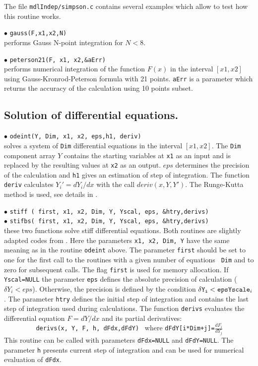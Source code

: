 \documentclass[12pt,a4paper]{article}
\begin{document}
The file \verb|mdlIndep/simpson.c|  contains several examples which allow to test how this routine works.


\noindent$\bullet$ \verb|gauss(F,x1,x2,N)|\\
performs Gauss N-point integration for $N<8$.  


\noindent$\bullet$ \verb|peterson21(F, x1, x2,&aErr)|\\
performs numerical integration of the function $F(x)$ in the interval $[x1,x2]$ using Gauss-Kronrod-Peterson formula with 21 points. {\tt aErr} is a  parameter which returns the accuracy of the calculation using 10 points subset.  

\subsection{ Solution of differential equations.} 
\noindent$\bullet$ \verb|odeint(Y, Dim, x1, x2, eps,h1, deriv)|\\
solves a  system of \verb|Dim| differential  equations in the interval 
$[x1,x2]$. The  \verb|Dim| component array $Y$ contains the starting variables at \verb|x1| as an input and is replaced by the
resulting values at \verb|x2| as an output. $eps$ determines the precision of the 
calculation and  \verb|h1| gives an estimation of step of integration.  
The function \verb|deriv| calculates 
$Y_i' = dY_i/dx$ with the call $deriv(x,Y,Y')$. The Runge-Kutta method is
used, see details in \cite{Numerical}. 


\noindent$\bullet$ \verb|stiff ( first, x1, x2, Dim, Y, Yscal, eps, &htry,derivs)|\\
\noindent$\bullet$ \verb|stifbs( first, x1, x2, Dim, Y, Yscal, eps, &htry,derivs)|\\
these two functions solve  stiff  differential
equations. Both routines  are slightly adapted codes from
\cite{Numerical}. Here the parameters  {\tt x1, x2, Dim, Y} have the same
meaning as in the routine  {\tt odeint}  above. The parameter {\tt first}
should be set to one for the first call to the routines with a given number of equations {\tt
Dim} and to zero for subsequent calls.  The flag {\tt first} is used for memory allocation.  If {\tt Yscal=NULL}  the parameter
{\tt eps} defines the absolute precision of calculation ($\delta Y_i < eps$).  Otherwise, the
precision is defined by the  condition $\delta {\tt Y_i} < {\tt eps} {\tt Yscale}_i$. 
The parameter {\tt htry} defines the initial step of integration and contains the last step of
integration used during  calculations.
The function {\tt derivs} evaluates the differential equation
$F= dY/dx$  and its partial derivatives:\\  
\verb|         derivs(x, Y, F, h, dFdx,dFdY) | where
\verb|dFdY[i*Dim+j]=|$\frac{dF_i}{dY_j}$\\
This routine can
be called with parameters {\tt dFdx=NULL} and  {\tt dFdY=NULL}. The  parameter
{\tt h} presents current step of integration and can be used for numerical
evaluation of  {\tt dFdx}. 
\end{document}
